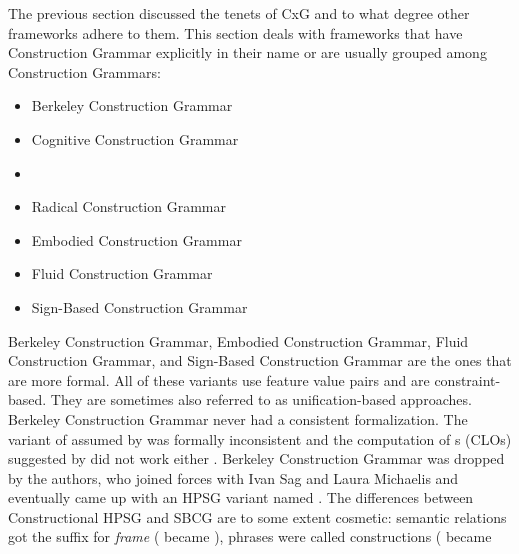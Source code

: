 \documentclass[output=paper,biblatex,babelshorthands,newtxmath,draftmode,colorlinks,citecolor=brown]{langscibook}
\begin{document}
The previous section discussed the tenets of CxG and to what degree other frameworks adhere to them. This
section deals with frameworks that have Construction Grammar explicitly in their name or are usually
grouped among Construction Grammars:
\begin{sloppypar}
\begin{itemize}
\item Berkeley Construction Grammar \citep{Fillmore85a,Fillmore88a,KF99a,FriedHSK}
\item Cognitive Construction Grammar \citep{Lakoff87a-u,Goldberg95a,Goldberg2006a}
\item {} \citep{Langacker87a-u,Langacker2000a,Langacker2008a-u,Dabrowska2004a}
\item Radical Construction Grammar \citep{Croft2001a}
\item Embodied Construction Grammar \citep{BC2005a}
\item Fluid Construction Grammar \citep{SDB2006a-u,SteelsFluid-ed}
\item Sign-Based Construction Grammar \citep{Sag2010b,Sag2012a}
\end{itemize}
\end{sloppypar}
\largerpage[2]%
\noindent
Berkeley Construction Grammar, Embodied Construction Grammar, Fluid Construction Grammar, and
Sign-Based Construction Grammar are the ones that are more formal. All of these variants use feature
value pairs and are constraint-based. They are sometimes also referred to as unification-based
approaches. Berkeley Construction Grammar never had a consistent formalization. The variant of
 assumed by \citet{KF99a} was formally inconsistent \citep[Section~2.4]{Mueller2006d} and the computation of s (CLOs) suggested  by \citet{Kay2002a} did not work either \citep[Section~3]{Mueller2006d}. Berkeley Construction
Grammar was dropped by the authors, who joined forces with Ivan Sag and Laura Michaelis and eventually
came up with an HPSG variant named \sbcg{} \citep{Sag2012a}. The differences between
Constructional HPSG \citep{Sag97a} and SBCG are to some extent cosmetic: semantic relations got the
suffix  for \emph{frame} ( became ), phrases were called constructions ( became
\end{document}
